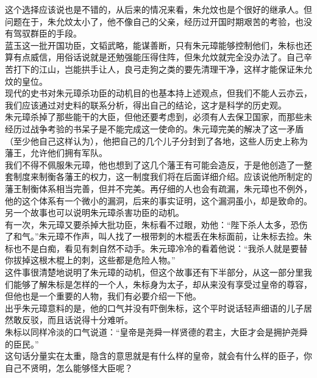 \begin{multicols}{\theparacolNo}
这个选择应该说也是不错的，从后来的情况来看，朱允炆也是个很好的继承人。但问题在于，朱允炆太小了，他不像自己的父亲，经历过开国时期艰苦的考验，也没有驾驭群臣的手段。\\

蓝玉这一批开国功臣，文韬武略，能谋善断，只有朱元璋能够控制他们，朱标也还算有点威信，用俗话说就是还勉强能压得住阵，但朱允炆就完全没办法了。自己辛苦打下的江山，岂能拱手让人，良弓走狗之类的要先清理干净，这样才能保证朱允炆的皇位。\\

现代的史书对朱元璋杀功臣的动机目的也基本持上述观点，但我们不能人云亦云，我们应该通过对史料的联系分析，得出自己的结论，这才是科学的历史观。\\

朱元璋杀掉了那些能干的大臣，但他还要考虑到，必须有人去保卫国家，而那些未经历过战争考验的书呆子是不能完成这一使命的。朱元璋完美的解决了这一矛盾（至少他自己这样认为），他把自己的几个儿子分封到了各地，这些人历史上称为藩王，允许他们拥有军队。\\

我们不得不佩服朱元璋，他也想到了这几个藩王有可能会造反，于是他创造了一整套制度来制衡各藩王的权力，这一制度我们将在后面详细介绍。应该说他所制定的藩王制衡体系相当完善，但并不完美。再仔细的人也会有疏漏，朱元璋也不例外，他的这个体系有一个微小的漏洞，后来的事实证明，这个漏洞虽小，却是致命的。\\

另一个故事也可以说明朱元璋杀害功臣的动机。\\

有一次，朱元璋又要杀掉大批功臣，朱标看不过眼，劝他：“陛下杀人太多，恐伤了和气。”朱元璋不作声，叫人找了一根带刺的木棍丢在朱标面前，让朱标去捡。朱标也不是白痴，看见有刺自然不动手。朱元璋冷冷的看着他说：“我杀人就是要替你拔掉这根木棍上的刺，这些都是危险人物。”\\

这件事很清楚地说明了朱元璋的动机，但这个故事还有下半部分，从这一部分里我们能够了解朱标是怎样的一个人，朱标身为太子，却从来没有享受过皇帝的尊容，但他也是一个重要的人物，我们有必要介绍一下他。\\

出乎朱元璋意料的是，他的口气并没有吓倒朱标，这个平时说话轻声细语的儿子居然敢反驳，而且话说得十分难听。\\

朱标以同样冷淡的口气说道：“皇帝是尧舜一样贤德的君主，大臣才会是拥护尧舜的臣民。”\\

这句话分量实在太重，隐含的意思就是有什么样的皇帝，就会有什么样的臣子，你自己不贤明，怎么能够怪大臣呢？\\


\end{multicols}
